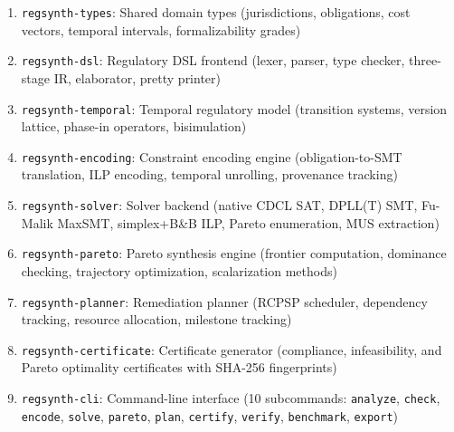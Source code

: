 \documentclass[11pt,twocolumn]{article}
\begin{document}
\begin{enumerate}[nosep,leftmargin=*]
  \item \texttt{regsynth-types}: Shared domain types (jurisdictions, obligations,
    cost vectors, temporal intervals, formalizability grades)
  \item \texttt{regsynth-dsl}: Regulatory DSL frontend (lexer, parser, type checker,
    three-stage IR, elaborator, pretty printer)
  \item \texttt{regsynth-temporal}: Temporal regulatory model (transition systems,
    version lattice, phase-in operators, bisimulation)
  \item \texttt{regsynth-encoding}: Constraint encoding engine (obligation-to-SMT
    translation, ILP encoding, temporal unrolling, provenance tracking)
  \item \texttt{regsynth-solver}: Solver backend (native CDCL SAT, DPLL(T) SMT,
    Fu-Malik MaxSMT, simplex+B\&B ILP, Pareto enumeration, MUS extraction)
  \item \texttt{regsynth-pareto}: Pareto synthesis engine (frontier computation,
    dominance checking, trajectory optimization, scalarization methods)
  \item \texttt{regsynth-planner}: Remediation planner (RCPSP scheduler,
    dependency tracking, resource allocation, milestone tracking)
  \item \texttt{regsynth-certificate}: Certificate generator (compliance,
    infeasibility, and Pareto optimality certificates with SHA-256 fingerprints)
  \item \texttt{regsynth-cli}: Command-line interface (10 subcommands:
    \texttt{analyze}, \texttt{check}, \texttt{encode}, \texttt{solve},
    \texttt{pareto}, \texttt{plan}, \texttt{certify}, \texttt{verify},
    \texttt{benchmark}, \texttt{export})
\end{enumerate}
\end{document}
